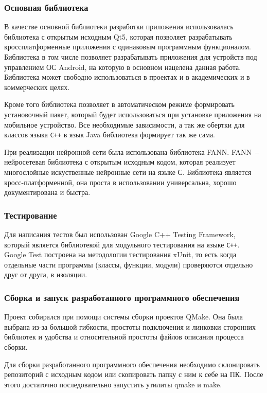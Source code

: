 \subsubsection{Основная библиотека}

В качестве основной библиотеки разработки приложения использовалась библиотека с
открытым исходным Qt5,
которая позволяет разрабатывать кроссплатформенные приложения с одинаковым
программным функционалом. Библиотека в том числе позволяет разрабатывать приложения
для устройств под управлением ОС Android, на которую в основном нацелена данная работа.
Библиотека может свободно использоваться в проектах и в академических и в коммерческих целях.

Кроме того библиотека позволяет в автоматическом режиме формировать установочный пакет,
который будет использоваться при установке приложения на мобильное устройство.
Все необходимые зависимости, а так же обертки для классов языка \verb|C++| в язык Java
библиотека формирует так же сама.

При реализации нейронной сети была использована библиотека FANN\cite{fann}. FANN~--
нейросетевая библиотека с открытым исходным кодом, которая реализует многослойные искуственные
нейронные сети на языке С. Библиотека является кросс-платформенной, она проста в использовании
универсальна, хорошо документирована и быстра.

\subsubsection{Тестирование}

Для написания тестов был использован Google C++ Testing Framework, который
является библиотекой для модульного тестирования на языке \verb|C++|. Google
Test построена на методологии тестирования xUnit, то есть когда отдельные части
программы (классы, функции, модули) проверяются отдельно друг от друга, в
изоляции.

\subsubsection{Сборка и запуск разработанного программного обеспечения}

Проект собирался при помощи системы сборки проектов QMake. Она была выбрана
из-за большой гибкости, простоты подключения и линковки сторонних библиотек и
удобства и относительной простоты файлов описания процесса сборки.

Для сборки разработанного программного обеспечения необходимо склонировать
репозиторий с исходным кодом или скопировать папку с ним к себе на ПК. После этого
достаточно последовательно запустить утилиты qmake и make.

